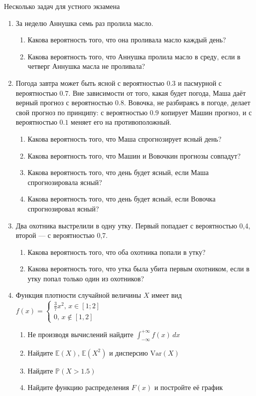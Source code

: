 \documentclass[12pt,a4paper]{article}
\newcommand{\E}{\mathbb{E}}
\renewcommand{\P}{\mathbb{P}}
\newcommand{\Var}{\mathrm{Var}}
\begin{document}
Несколько задач для устного экзамена

\begin{enumerate}
\item За неделю Аннушка семь раз пролила масло. 
\begin{enumerate}
\item Какова вероятность того, что она проливала масло каждый день?
\item Какова вероятность того, что Аннушка пролила масло в среду, если в четверг Аннушка масла не проливала?
\end{enumerate}

\item Погода завтра может быть ясной с вероятностью $0.3$ и пасмурной с вероятностью $0.7$. Вне зависимости от того, какая будет погода, Маша даёт верный прогноз с вероятностью $0.8$. Вовочка, не разбираясь в погоде, делает свой прогноз по принципу: с вероятностью $0.9$ копирует Машин прогноз, и с вероятностью $0.1$ меняет его на противоположный. 
\begin{enumerate}
\item Какова вероятность того, что Маша спрогнозирует ясный день?
\item Какова вероятность того, что Машин и Вовочкин прогнозы совпадут?
\item Какова вероятность того, что день будет ясный, если Маша спрогнозировала ясный?
\item Какова вероятность того, что день будет ясный, если Вовочка спрогнозировал ясный?
\end{enumerate} 

\item Два охотника выстрелили в одну утку. Первый попадает с вероятностью 0,4, второй --- с вероятностью 0,7.  
\begin{enumerate}
\item Какова вероятность того, что оба охотника попали в утку?
\item Какова вероятность того, что утка была убита первым охотником, если в утку попал только один из охотников?
\end{enumerate}




\item Функция плотности случайной величины $X$ имеет вид $f(x)=\left\{\begin{array}{l}
\frac{3}{7}x^2,\, x\in[1;2] \\
0,\, x\notin [1,2] 
\end{array}\right.$
\begin{enumerate}
\item Не производя вычислений найдите $\int_{-\infty}^{+\infty}f(x)\,dx$
\item Найдите $\E(X)$, $\E(X^2)$ и дисперсию $\Var(X)$
\item Найдите $\P(X>1.5)$
\item Найдите функцию распределения $F(x)$ и постройте её график
\end{enumerate}



\end{enumerate}
\end{document}
